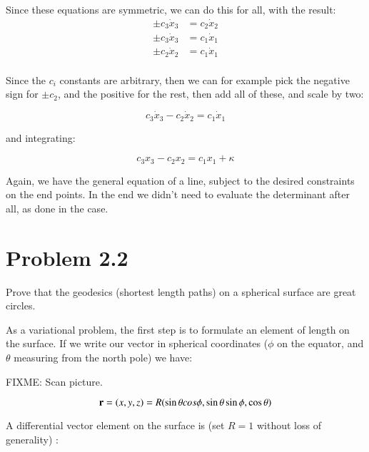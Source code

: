 \documentclass{article}
\newcommand{\xdot}[0]{\dot{x}}
\begin{document}
%

Since these equations are symmetric, we can do this for all, with the result:
\begin{align*}
\pm c_3 \xdot_3 &= c_2 \xdot_2 \\
\pm c_3 \xdot_3 &= c_1 \xdot_1 \\
\pm c_2 \xdot_2 &= c_1 \xdot_1 \\
\end{align*}

Since the $c_i$ constants are arbitrary, then we can for example pick the negative sign for $\pm c_2$, and the positive for the rest, then add all of these, and scale by two:

\begin{equation*}
c_3 \xdot_3 - c_2 \xdot_2 = c_1 \xdot_1
\end{equation*}

and integrating:

\begin{equation*}
c_3 x_3 - c_2 x_2 = c_1 x_1 + \kappa
\end{equation*}

Again, we have the general equation of a line, subject to the desired constraints on the end points.  In the end we didn't need to 
evaluate the determinant after all, as done in the 
 case.

\section{ Problem 2.2 }

Prove that the geodesics (shortest length paths) on a spherical surface are great circles.

As a variational problem, the first step is to formulate an element of length on the surface.  If we write our vector in spherical coordinates ($\phi$ on the equator, and $\theta$ measuring from the north pole) we have:

FIXME: Scan picture.

\begin{equation*}
\mathbf{r} = (x, y, z) = R( \sin\theta cos\phi, \sin\theta \sin\phi, \cos\theta)
\end{equation*}

A differential vector element on the surface is (set $R=1$ without loss of generality) :
\end{document}
